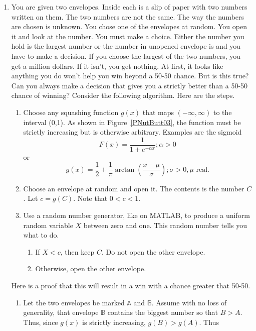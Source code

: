 \documentclass{article}[10pt]
\begin{document}
\begin{enumerate}
\item
  \label{PNutButt01}

  You are given two envelopes. Inside each is a slip of paper with two numbers
  written on them. The two numbers are not the same. The way the numbers
  are chosen is unknown. You chose one of the envelopes at random. You open
  it and look at the number. You must make a choice. Either the number you
  hold is the largest number or the number in unopened envelope is and you
  have to make a decision.
  If you choose the largest of the two numbers, you get a million dollars.
  If it isn't, you get nothing.
  At first, it looks like anything you do won't help you win beyond a
  50-50 chance. But is this true? Can you always make a decision that gives you
  a strictly better than a 50-50 chance of winning? Consider the following algorithm.
  Here are the steps.
  \begin{enumerate}
  \item Choose any squashing function $g(x)$ that maps $(-\infty, \infty)$ to the interval (0,1). As shown in Figure~\ref{PNutButt03}, the function
    must be strictly increasing but is otherwise arbitrary. Examples are the sigmoid
    $$F (x)=\frac{1}{1+e^{-\alpha x}} ; \alpha >0$$
    or
    $$ g(x) = \frac{1}{2} + \frac{1}{\pi} \arctan \left( \frac{x-\mu}{\sigma} \right) ; \sigma >0, \mu \mbox{ real}. $$
  \item Choose an envelope at random and open it. The contents is the number $C$. Let $c=g(C)$. Note that $0 <c <1$.
  \item Use a random number generator, like on MATLAB, to produce a uniform random variable $X$ between zero and one. This random number tells you what to do.
    \begin{enumerate}
    \item If $X<c$, then keep $C$. Do not open the other envelope.
    \item Otherwise, open the other envelope.
    \end{enumerate}
  \end{enumerate}
  Here is a proof that this will result in a win with a chance greater that 50-50.
  \begin{enumerate}
  \item Let the two envelopes be marked $\mathbb{A}$ and $\mathbb{B}$. Assume with no loss of generality, that
    envelope $\mathbb{B}$ contains the biggest number so that $B > A$. Thus, since $g(x)$ is strictly increasing, $g(B) > g(A)$. Thus

\end{enumerate}
\end{enumerate}
\end{document}

